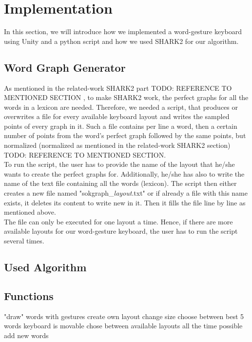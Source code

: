 \chapter{Implementation}

In this section, we will introduce how we implemented a word-gesture keyboard using Unity and a python script and how we used SHARK2 for our algorithm.

\section*{Word Graph Generator}
As mentioned in the related-work SHARK2 part TODO: REFERENCE TO MENTIONED SECTION , to make SHARK2 work, the perfect graphs for all the words in a lexicon are needed. Therefore, we needed a script, that produces or overwrites a file for every available keyboard layout and writes the sampled points of every graph in it. Such a file contains per line a word, then a certain number of points from the word's perfect graph followed by the same points, but normalized (normalized as mentioned in the related-work SHARK2 section) TODO: REFERENCE TO MENTIONED SECTION.\\
To run the script, the user has to provide the name of the layout that he/she wants to create the perfect graphs for. Additionally, he/she has also to write the name of the text file containing all the words (lexicon). The script then either creates a new file named "sokgraph\_\textit{layout}.txt" or if already a file with this name exists, it deletes its content to write new in it. Then it fills the file line by line as mentioned above.\\
The file can only be executed for one layout a time. Hence, if there are more available layouts for our word-gesture keyboard, the user has to run the script several times.

\section{Used Algorithm}

\section{Functions}

"draw" words with gestures
create own layout
change size
choose between best 5 words
keyboard is movable
chose between available layouts all the time possible
add new words